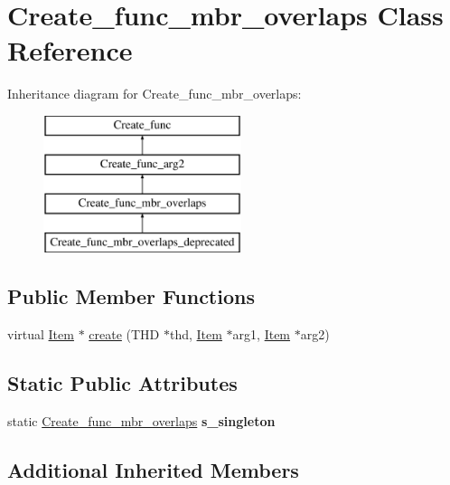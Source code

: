 \hypertarget{classCreate__func__mbr__overlaps}{}\section{Create\+\_\+func\+\_\+mbr\+\_\+overlaps Class Reference}
\label{classCreate__func__mbr__overlaps}
Inheritance diagram for Create\+\_\+func\+\_\+mbr\+\_\+overlaps\+:\begin{figure}[H]
\begin{center}
\leavevmode
\includegraphics[height=4.000000cm]{classCreate__func__mbr__overlaps}
\end{center}
\end{figure}
\subsection*{Public Member Functions}
\begin{DoxyCompactItemize}
\item 
virtual \mbox{\hyperlink{classItem}{Item}} $\ast$ \mbox{\hyperlink{classCreate__func__mbr__overlaps_ac51d17746cff6df10ac0c90d325a652e}{create}} (T\+HD $\ast$thd, \mbox{\hyperlink{classItem}{Item}} $\ast$arg1, \mbox{\hyperlink{classItem}{Item}} $\ast$arg2)
\end{DoxyCompactItemize}
\subsection*{Static Public Attributes}
\begin{DoxyCompactItemize}
\item 
\mbox{\label{classCreate__func__mbr__overlaps_a9268e5f7e2c0a954fa10eb936d68dd3f}} 
static \mbox{\hyperlink{classCreate__func__mbr__overlaps}{Create\+\_\+func\+\_\+mbr\+\_\+overlaps}} {\bfseries s\+\_\+singleton}
\end{DoxyCompactItemize}
\subsection*{Additional Inherited Members}


